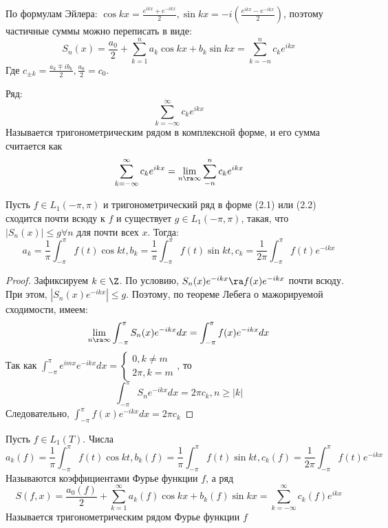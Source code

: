 По формулам Эйлера: \(\cos kx = \frac{e^{ikx} + e^{-ikx}}{2}, \sin kx = -i\left( \frac{e^{ikx} - e^{-ikx}}{2} \right)\), поэтому частичные суммы можно переписать в виде:
\[S_n(x) = \frac{a_0}{2} + \sum_{k = 1}^n a_k\cos kx + b_k\sin kx = \sum_{k = -n}^n c_ke^{ikx}\]
Где \(c_{\pm k} = \frac{a_k \mp ib_k}{2}, \frac{a_0}{2} = c_0\). 

\begin{definition}
        Ряд:
    \begin{equation}
        \sum_{k = -\infty}^{\infty} c_ke^{ikx}
    \end{equation}
    Называется тригонометрическим рядом в комплексной форме, и его сумма считается как 
    \[\sum_{k = -\infty}^{\infty} c_ke^{ikx} = \lim_{n \ra \infty} \sum_{-n}^n c_ke^{ikx}\]
\end{definition}

\begin{lemma}
    Пусть \(f \in L_1(-\pi, \pi)\) и тригонометрический ряд в форме (2.1) или (2.2) сходится почти всюду к \(f\) и существует \(g \in L_1(-\pi, \pi)\), такая, что \(|S_n(x)| \le g \forall n\) для почти всех \(x\). Тогда:
    \[a_k = \frac{1}{\pi}\int_{-\pi}^\pi f(t)\cos kt, b_k = \frac{1}{\pi}\int_{-\pi}^\pi f(t)\sin kt, c_k = \frac{1}{2\pi}\int_{-\pi}^\pi f(t)e^{-ikx}\]
\end{lemma}
\begin{proof}
    Зафиксируем \(k \in \Z\). По условию, \(S_n(x) e^{-ikx} \ra f(x)e^{-ikx}\) почти всюду. При этом, \(|S_n(x) e^{-ikx}| \le g\). Поэтому, по теореме Лебега о мажорируемой сходимости, имеем: 
    \[\lim_{n \ra \infty} \int_{-\pi}^{\pi}S_n(x)e^{-ikx}dx = \int_{-\pi}^{\pi}f(x)e^{-ikx}dx\]
    Так как \(\int_{-\pi}^{\pi}e^{imx}e^{-ikx}dx = \left\{\begin{array}{l}
        0, k \ne m \\
        2\pi, k = m
    \end{array}\right.\), то 
    \[\int_{-\pi}^{\pi}S_ne^{-ikx}dx = 2\pi c_k, n \ge |k|\]
    Следовательно, \(\int_{-\pi}^{\pi} f(x)e^{-ikx}dx = 2\pi c_k\)
\end{proof}

\begin{definition}
    Пусть \(f \in L_1(T)\). Числа
    \[a_k(f) = \frac{1}{\pi}\int_{-\pi}^\pi f(t)\cos kt, b_k(f) = \frac{1}{\pi}\int_{-\pi}^\pi f(t)\sin kt, c_k(f) = \frac{1}{2\pi}\int_{-\pi}^\pi f(t)e^{-ikx}\]
    Называются коэффициентами Фурье функции \(f\), а ряд
    \[S(f, x) = \frac{a_0(f)}{2} + \sum_{k = 1}^\infty a_k(f)\cos kx + b_k(f)\sin kx = \sum_{k = -\infty}^{\infty} c_k(f)e^{ikx}\]
    Называется тригонометрическим рядом Фурье функции \(f\)
\end{definition}


